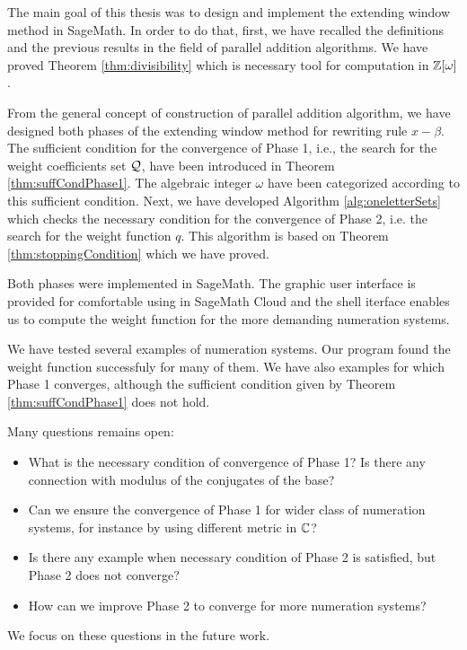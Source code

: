 The main goal of this thesis was to design and implement the extending window method in SageMath. In order to do that, first, we have recalled the definitions and the previous results in the field of parallel addition algorithms. We have proved Theorem \ref{thm:divisibility} which is necessary tool for computation in $\mathbb{Z}[\omega]$.

From the general concept of construction of parallel addition algorithm, we have designed both phases of the extending window method for rewriting rule $x-\beta$. The sufficient condition for the convergence of Phase 1, i.e., the search for the weight coefficients set $\mathcal{Q}$, have been introduced in Theorem \ref{thm:suffCondPhase1}. The algebraic integer $\omega$ have been categorized according to this sufficient condition. Next, we have developed Algorithm \ref{alg:oneletterSets} which checks the necessary condition for the convergence of Phase 2, i.e. the search for the weight function $q$. This algorithm is based on Theorem \ref{thm:stoppingCondition} which we have proved.

Both phases were implemented in SageMath. The graphic user interface is provided for comfortable using in SageMath Cloud and the shell iterface enables us to compute the weight function for the more demanding numeration systems.

We have tested several examples of numeration systems. Our program found the weight function successfuly for many of them. We have also examples for which Phase 1 converges, although the sufficient condition given by Theorem \ref{thm:suffCondPhase1} does not hold. 

Many questions remains open:
\begin{itemize}
\item What is the necessary condition of convergence of Phase 1? Is there any connection with modulus of the conjugates of the base?
\item Can we ensure the convergence of Phase 1 for wider class of numeration systems, for instance by using different metric in $\mathbb{C}$?
\item Is there any example when necessary condition of Phase 2 is satisfied, but Phase 2 does not converge?
\item How can we improve Phase 2 to converge for more numeration systems?
\end{itemize}
We focus on these questions in the future work.